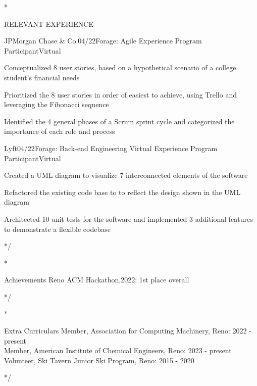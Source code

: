 \documentclass{resume} %
\begin{document}

\/*
\begin{rSection}{RELEVANT EXPERIENCE}


	\begin{emptyrSubsection}{JPMorgan Chase \& Co.}{04/22}{Forage: Agile Experience Program Participant}{Virtual}
		\item Conceptualized 8 user stories, based on a hypothetical scenario of a college student’s financial needs
		\item Prioritized the 8 user stories in order of easiest to achieve, using Trello and leveraging the Fibonacci sequence
		\item Identified the 4 general phases of a Scrum sprint cycle and categorized the importance of each role and process
	\end{emptyrSubsection}

	\begin{emptyrSubsection}{Lyft}{04/22}{Forage: Back-end Engineering Virtual Experience Program Participant}{Virtual}
		\item Created a UML diagram to visualize 7 interconnected elements of the software
		\item Refactored the existing code base to to reflect the design shown in the UML diagram
		\item Architected 10 unit tests for the software and implemented 3 additional features to demonstrate a flexible codebase
	\end{emptyrSubsection}

\end{rSection}
*/


\/*
\begin{rSection}{Achievements}
	{Reno ACM Hackathon,2022: 1st place overall}
\end{rSection}
*/


\/*
\begin{rSection}{Extra Curriculars}
	{Member, Association for Computing Machinery, Reno: 2022 - present}\\
	{Member, American Institute of Chemical Engineers, Reno: 2023 - present}\\
	{Volunteer, Ski Tavern Junior Ski Program, Reno: 2015 - 2020}\\
\end{rSection}
*/

\end{document}

